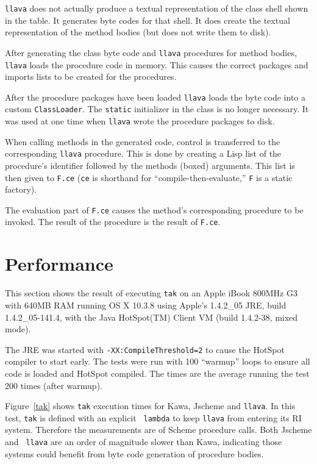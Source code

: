 \documentclass{acm-final/sig-alternate-modified}
\begin{document}
{\tt llava} does not actually produce a textual representation of the
class shell shown in the table.  It generates byte codes for that
shell.  It does create the textual representation of the method bodies
(but does not write them to disk).

After generating the class byte code and {\tt llava} procedures for
method bodies, {\tt llava} loads the procedure code in memory.  This
causes the correct packages and imports lists to be created for the
procedures.

After the procedure packages have been loaded {\tt llava} loads the
byte code into a custom {\tt ClassLoader}.  The {\tt static}
initializer in the class is no longer necessary.  It was used at one
time when {\tt llava} wrote the procedure packages to disk.

When calling methods in the generated code, control is transferred to
the corresponding {\tt llava} procedure.  This is done by creating a
Lisp list of the procedure's identifier followed by the methods
(boxed) arguments.  This list is then given to {\tt F.ce} ({\tt ce} is
shorthand for ``compile-then-evaluate,'' {\tt F} is a static factory).

The evaluation part of {\tt F.ce} causes the method's corresponding
procedure to be invoked.  The result of the procedure is the result
of {\tt F.ce}.


\section{Performance}

This section shows the result of executing {\tt tak} \cite{gabriel} on
an Apple iBook 800MHz G3 with 640MB RAM running OS X 10.3.8 using
Apple's 1.4.2\_05 JRE, build 1.4.2\_05-141.4, with the Java HotSpot(TM)
Client VM (build 1.4.2-38, mixed mode).


The JRE was started with {\tt -XX:CompileThreshold=2} to cause the
HotSpot compiler to start early.  The tests were run with 100
``warmup'' loops to ensure all code is loaded and HotSpot compiled.
The times are the average running the test 200 times (after warmup).

Figure~\ref{tak} shows {\tt tak} execution times for Kawa, Jscheme and
{\tt llava}.  In this test, {\tt tak} is defined with an explicit {\tt
lambda} to keep {\tt llava} from entering its RI system.  Therefore
the measurements are of Scheme procedure calls.  Both Jscheme and {\tt
llava} are an order of magnitude slower than Kawa, indicating those
systems could benefit from byte code generation of procedure bodies.
\end{document}
